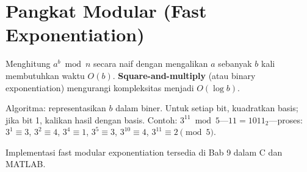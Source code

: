 \section{Pangkat Modular (Fast Exponentiation)}

Menghitung $a^b \bmod n$ secara naif dengan mengalikan $a$ sebanyak $b$ kali membutuhkan waktu $O(b)$. \textbf{Square-and-multiply} (atau binary exponentiation) mengurangi kompleksitas menjadi $O(\log b)$.

Algoritma: representasikan $b$ dalam biner. Untuk setiap bit, kuadratkan basis; jika bit 1, kalikan hasil dengan basis. Contoh: $3^{11} \bmod 5$---$11 = 1011_2$---proses: $3^1 \equiv 3$, $3^2 \equiv 4$, $3^4 \equiv 1$, $3^5 \equiv 3$, $3^{10} \equiv 4$, $3^{11} \equiv 2 \pmod{5}$.

Implementasi fast modular exponentiation tersedia di Bab 9 dalam C dan MATLAB.
